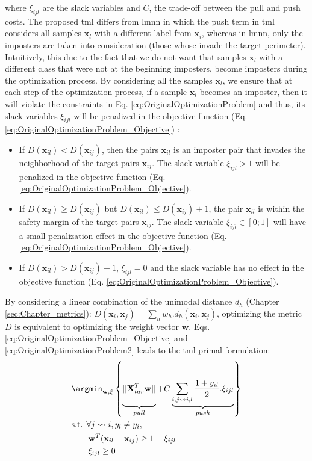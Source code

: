 \noindent where $\xi_{ijl}$ are the slack variables and $C$, the trade-off between the pull and push costs. The proposed {\sc tml} differs from {\sc lmnn} in which the push term in {\sc tml} considers all samples $\textbf{x}_l$ with a different label from $\textbf{x}_i$, whereas in {\sc lmnn}, only the imposters are taken into consideration (those whose invade the target perimeter). Intuitively, this due to the fact that we do not want that samples $\textbf{x}_l$ with a different class that were not at the beginning imposters, become imposters during the optimization process. By considering all the samples $\textbf{x}_l$, we ensure that at each step of the optimization process, if a sample $\textbf{x}_l$ becomes an imposter, then it will violate the constraints in Eq. \ref{eq:OriginalOptimizationProblem} and thus, its slack variables $\xi_{ijl}$ will be penalized in the objective function (Eq. \ref{eq:OriginalOptimizationProblem_Objective}) :
\begin{itemize}
	\item If $D(\textbf{x}_{il}) < D(\textbf{x}_{ij})$, then the pairs $\textbf{x}_{il}$ is an imposter pair that invades the neighborhood of the target pairs $\textbf{x}_{ij}$. The slack variable  $\xi_{ijl} > 1$ will be penalized in the objective function (Eq. \ref{eq:OriginalOptimizationProblem_Objective}). 
	\item If $D(\textbf{x}_{il}) \geq D(\textbf{x}_{ij})$ but $D(\textbf{x}_{il}) \leq D(\textbf{x}_{ij})+1$, the pair $\textbf{x}_{il}$ is within the safety margin of the target pairs $\textbf{x}_{ij}$. The slack variable $ \xi_{ijl} \in [0;1]$ will have a small penalization effect in the objective function (Eq. \ref{eq:OriginalOptimizationProblem_Objective}).
	\item If $D(\textbf{x}_{il}) > D(\textbf{x}_{ij}) +1$, $\xi_{ijl} = 0$ and the slack variable has no effect in the objective function (Eq. \ref{eq:OriginalOptimizationProblem_Objective}).
\end{itemize}
\noindent By considering a linear combination of the unimodal distance $d_h$ (Chapter \ref{sec:Chapter_metrics}): $D(\textbf{x}_i,\textbf{x}_j) = \sum_h w_h.d_h(\textbf{x}_i,\textbf{x}_j)$, optimizing the metric $D$ is equivalent to optimizing the weight vector $\textbf{w}$. Eqs. \ref{eq:OriginalOptimizationProblem_Objective} and \ref{eq:OriginalOptimizationProblem2} leads to the {\sc tml} primal formulation:
		\begin{align}
		&\displaystyle 		\argmin_{\textbf{w},\xi}
		\left\lbrace \underbrace{
		\vphantom{ \sum\limits_{i,j \rightsquigarrow i,l} \frac{1+y_{il}}{2}.\xi_{ijl} }
			||\textbf{X}_{tar}^T \textbf{w}||	
		}_{pull}					
		+	
		C \underbrace{				
			\sum\limits_{i,j \rightsquigarrow i,l} \frac{1+y_{il}}{2}.\xi_{ijl}
		}_{push} \right\rbrace \label{eq:MMLPrimal} \\
		&\text{s.t.  } \forall j \rightsquigarrow i, y_l\neq y_i, \nonumber \\
		& \qquad \textbf{w}^T(\textbf{x}_{il}-\textbf{x}_{ij}) \geq 1-\xi_{ijl} \label{eq:MMLPrimal_constraint1} \\
		& \qquad \xi_{ijl} \geq 0
		\label{eq:MMLPrimal_constraint2}
		\end{align}
